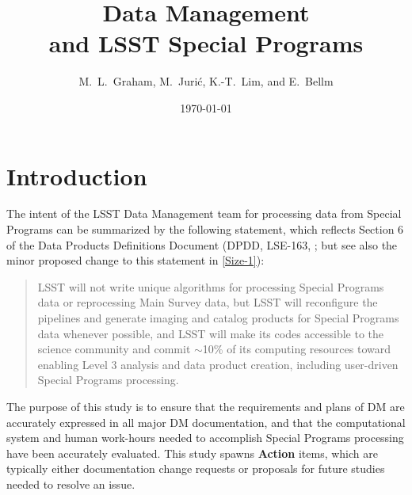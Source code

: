 \documentclass[DM,lsstdraft,toc]{lsstdoc}
\title[LSST Special Programs]{Data Management \\ and LSST Special Programs}
\author{M.~L.~Graham, M.~Juri\'{c}, K.-T.~Lim, and E.~Bellm}
\date{\today}
\begin{document}
\maketitle




\section{Introduction} \label{sec:intro}

The intent of the LSST Data Management team for processing data from Special Programs can be summarized by the following statement, which reflects Section 6 of the Data Products Definitions Document (DPDD, LSE-163, \cite{LSE-163}; but see also the minor proposed change to this statement in \ref{Size-1}):

\begin{quote}
LSST will not write unique algorithms for processing Special Programs data or reprocessing Main Survey data, but LSST will reconfigure the pipelines and generate imaging and catalog products for Special Programs data whenever possible, and LSST will make its codes accessible to the science community and commit $\sim$10\% of its computing resources toward enabling Level 3 analysis and data product creation, including user-driven Special Programs processing.
\end{quote}

\noindent The purpose of this study is to ensure that the requirements and plans of DM are accurately expressed in all major DM documentation, and that the computational system and human work-hours needed to accomplish Special Programs processing have been accurately evaluated. This study spawns {\bf Action} items, which are typically either documentation change requests or proposals for future studies needed to resolve an issue.

\end{document}
